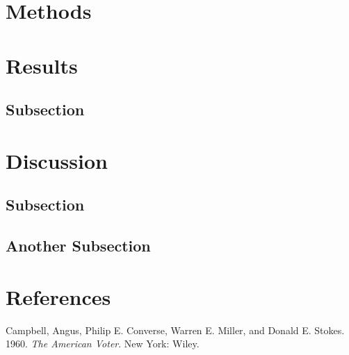 \documentclass[
  11pt,
  twocolumn]{article}
\newlength{\cslhangindent}
\newlength{\cslentryspacingunit} %
\newenvironment{CSLReferences}[2] %
 {%
  \setlength{\parindent}{0pt}
  \ifodd #1
  \let\oldpar\par
  \def\par{\hangindent=\cslhangindent\oldpar}
  \fi
  \setlength{\parskip}{#2\cslentryspacingunit}
 }%
 {}
\begin{document}
\hypertarget{methods}{%
\section{Methods}\label{methods}}

\hypertarget{results}{%
\section{Results}\label{results}}

\hypertarget{subsection}{%
\subsection{Subsection}\label{subsection}}

\hypertarget{discussion}{%
\section{Discussion}\label{discussion}}

\hypertarget{subsection-1}{%
\subsection{Subsection}\label{subsection-1}}

\hypertarget{another-subsection}{%
\subsection{Another Subsection}\label{another-subsection}}

\hypertarget{references}{%
\section*{References}\label{references}}

\hypertarget{refs}{}
\begin{CSLReferences}{1}{0}
\leavevmode{}%
Campbell, Angus, Philip E. Converse, Warren E. Miller, and Donald E.
Stokes. 1960. \emph{The {American} Voter}. {New York}: {Wiley}.

\end{CSLReferences}
\end{document}
